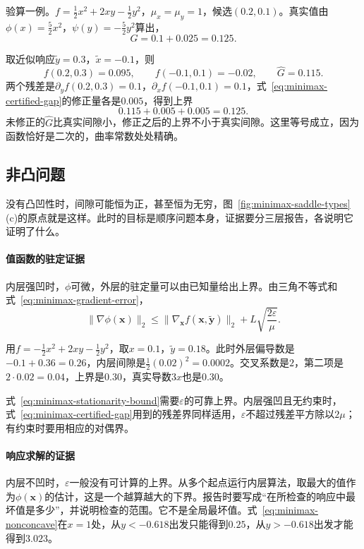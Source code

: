 验算一例。$f=\frac12x^2+2xy-\frac12y^2$，$\mu_x=\mu_y=1$，候选$(0.2,0.1)$。真实值由$\phi(x)=\frac52x^2$，$\psi(y)=-\frac52y^2$算出，
\[
 G=0.1+0.025=0.125.
\]

取近似响应$\tilde{y}=0.3$，$\tilde{x}=-0.1$，则
\[
 f(0.2,0.3)=0.095,\qquad f(-0.1,0.1)=-0.02,\qquad\hat{G}=0.115.
\]
两个残差是$\partial_yf(0.2,0.3)=0.1$，$\partial_xf(-0.1,0.1)=0.1$，式~\eqref{eq:minimax-certified-gap}的修正量各是$0.005$，得到上界
\[
 0.115+0.005+0.005=0.125.
\]
未修正的$\hat{G}$比真实间隙小，修正之后的上界不小于真实间隙。这里等号成立，因为函数恰好是二次的，曲率常数处处精确。

\subsection{非凸问题}
\label{sec:minimax-nonconvex}

没有凸凹性时，间隙可能恒为正，甚至恒为无穷，图~\ref{fig:minimax-saddle-types}(c)的原点就是这样。此时的目标是顺序问题本身，证据要分三层报告，各说明它证明了什么。

\paragraph{值函数的驻定证据}
内层强凹时，$\phi$可微，外层的驻定量可以由已知量给出上界。由三角不等式和式~\eqref{eq:minimax-gradient-error}，
\begin{equation}
 \lVert\nabla\phi(\bm{x})\rVert_2\leq\lVert\nabla_{\bm{x}}f(\bm{x},\tilde{\bm{y}})\rVert_2+L\sqrt{\frac{2\varepsilon}{\mu}}.
 \label{eq:minimax-stationarity-bound}
\end{equation}

用$f=-\frac12x^2+2xy-\frac12y^2$，取$x=0.1$，$\tilde{y}=0.18$。此时外层偏导数是$-0.1+0.36=0.26$，内层间隙是$\frac12(0.02)^2=0.0002$。交叉系数是$2$，第二项是$2\cdot0.02=0.04$，上界是$0.30$，真实导数$3x$也是$0.30$。

式~\eqref{eq:minimax-stationarity-bound}需要$\varepsilon$的可靠上界。内层强凹且无约束时，式~\eqref{eq:minimax-certified-gap}用到的残差界同样适用，$\varepsilon$不超过残差平方除以$2\mu$；有约束时要用相应的对偶界。

\paragraph{响应求解的证据}
内层不凹时，$\varepsilon$一般没有可计算的上界。从多个起点运行内层算法，取最大的值作为$\phi(\bm{x})$的估计，这是一个越算越大的下界。报告时要写成“在所检查的响应中最坏值是多少”，并说明检查的范围。它不是全局最坏值。式~\eqref{eq:minimax-nonconcave}在$x=1$处，从$y<-0.618$出发只能得到$0.25$，从$y>-0.618$出发才能得到$3.023$。

